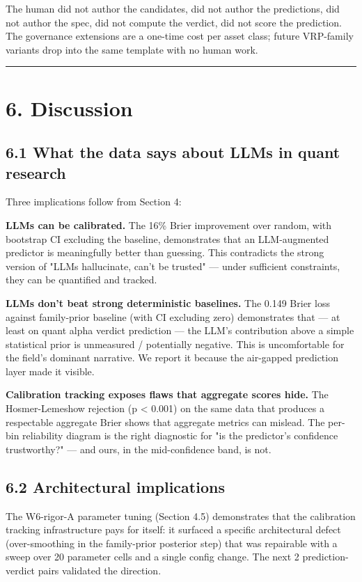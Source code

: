 \documentclass[11pt,a4paper]{article}
\begin{document}
The human did not author the candidates, did not author the predictions, did not author the spec, did not compute the verdict, did not score the prediction. The governance extensions are a one-time cost per asset class; future VRP-family variants drop into the same template with no human work.

\medskip\hrule\medskip

\section{6. Discussion}

\subsection{6.1 What the data says about LLMs in quant research}

Three implications follow from Section 4:

\textbf{LLMs can be calibrated.} The 16\% Brier improvement over random, with bootstrap CI excluding the baseline, demonstrates that an LLM-augmented predictor is meaningfully better than guessing. This contradicts the strong version of "LLMs hallucinate, can't be trusted" — under sufficient constraints, they can be quantified and tracked.

\textbf{LLMs don't beat strong deterministic baselines.} The 0.149 Brier loss against family-prior baseline (with CI excluding zero) demonstrates that — at least on quant alpha verdict prediction — the LLM's contribution above a simple statistical prior is unmeasured / potentially negative. This is uncomfortable for the field's dominant narrative. We report it because the air-gapped prediction layer made it visible.

\textbf{Calibration tracking exposes flaws that aggregate scores hide.} The Hosmer-Lemeshow rejection (p < 0.001) on the same data that produces a respectable aggregate Brier shows that aggregate metrics can mislead. The per-bin reliability diagram is the right diagnostic for "is the predictor's confidence trustworthy?" — and ours, in the mid-confidence band, is not.

\subsection{6.2 Architectural implications}

The W6-rigor-A parameter tuning (Section 4.5) demonstrates that the calibration tracking infrastructure pays for itself: it surfaced a specific architectural defect (over-smoothing in the family-prior posterior step) that was repairable with a sweep over 20 parameter cells and a single config change. The next 2 prediction-verdict pairs validated the direction.
\end{document}
